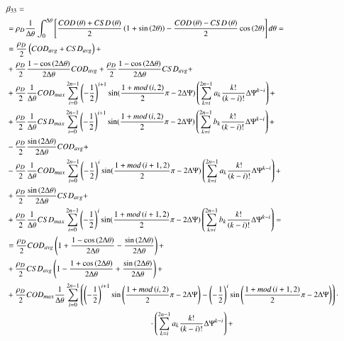 \documentclass[review]{elsarticle}
\begin{document}
\begin{enumerate}
\begin{equation}
\footnotesize
\begin{aligned}
&\beta_{33}=\\
&=\rho_{D}\frac{1}{\Delta\theta}\int_{0}^{\Delta\theta}\left[\frac{COD\left(\theta\right)+CSD\left(\theta\right)}{2}\left(1+\sin\left(2\theta\right)\right)-\frac{COD\left(\theta\right)-CSD\left(\theta\right)}{2}\cos\left(2\theta\right)\right]d\theta=\\
&=\frac{\rho_{D}}{2}\left(COD_{avg}+CSD_{avg}\right)+\\
&+\frac{\rho_{D}}{2}\frac{1-\cos\left(2\Delta\theta\right)}{2\Delta\theta}COD_{avg}+\frac{\rho_{D}}{2}\frac{1-\cos\left(2\Delta\theta\right)}{2\Delta\theta}CSD_{avg}+\\
&+\frac{\rho_{D}}{2}\frac{1}{\Delta\theta}COD_{max}\sum_{i=0}^{2n-1}\left(-\frac{1}{2}\right)^{i+1}\sin(\frac{1+mod\left(i,2\right)}{2}\pi-2\Delta\Psi)\left(\sum_{k=i}^{2n-1}a_{k}\frac{k!}{\left(k-i\right)!}\Delta\Psi^{k-i}\right)+\\
&+\frac{\rho_{D}}{2}\frac{1}{\Delta\theta}CSD_{max}\sum_{i=0}^{2n-1}\left(-\frac{1}{2}\right)^{i+1}\sin(\frac{1+mod\left(i,2\right)}{2}\pi-2\Delta\Psi)\left(\sum_{k=i}^{2n-1}b_{k}\frac{k!}{\left(k-i\right)!}\Delta\Psi^{k-i}\right)+\\
&-\frac{\rho_{D}}{2}\frac{\sin\left(2\Delta\theta\right)}{2\Delta\theta}COD_{avg}+\\
&-\frac{\rho_{D}}{2}\frac{1}{\Delta\theta}COD_{max}\sum_{i=0}^{2n-1}\left(-\frac{1}{2}\right)^{i}\sin(\frac{1+mod\left(i+1,2\right)}{2}\pi-2\Delta\Psi)\left(\sum_{k=i}^{2n-1}a_{k}\frac{k!}{\left(k-i\right)!}\Delta\Psi^{k-i}\right)+\\
&+\frac{\rho_{D}}{2}\frac{\sin\left(2\Delta\theta\right)}{2\Delta\theta}CSD_{avg}+\\
&+\frac{\rho_{D}}{2}\frac{1}{\Delta\theta}CSD_{max}\sum_{i=0}^{2n-1}\left(-\frac{1}{2}\right)^{i}\sin(\frac{1+mod\left(i+1,2\right)}{2}\pi-2\Delta\Psi)\left(\sum_{k=i}^{2n-1}b_{k}\frac{k!}{\left(k-i\right)!}\Delta\Psi^{k-i}\right)=\\
&=\frac{\rho_{D}}{2}COD_{avg}\left(1+\frac{1-\cos\left(2\Delta\theta\right)}{2\Delta\theta}-\frac{\sin\left(2\Delta\theta\right)}{2\Delta\theta}\right)+\\
&+\frac{\rho_{D}}{2}CSD_{avg}\left(1-\frac{1+\cos\left(2\Delta\theta\right)}{2\Delta\theta}+\frac{\sin\left(2\Delta\theta\right)}{2\Delta\theta}\right)+\\
&+\frac{\rho_{D}}{2}COD_{max}\frac{1}{\Delta\theta}\sum_{i=0}^{2n-1}\left(\left(-\frac{1}{2}\right)^{i+1}\sin\left(\frac{1+mod\left(i,2\right)}{2}\pi-2\Delta\Psi\right)-\left(-\frac{1}{2}\right)^{i}\sin\left(\frac{1+mod\left(i+1,2\right)}{2}\pi-2\Delta\Psi\right)\right)\cdot\\&\qquad\qquad\qquad\qquad\qquad\qquad\qquad\qquad\qquad\cdot\left(\sum_{k=i}^{2n-1}a_{k}\frac{k!}{\left(k-i\right)!}\Delta\Psi^{k-i}\right)+\\

\end{aligned}
\end{equation}
\end{enumerate}
\end{document}
